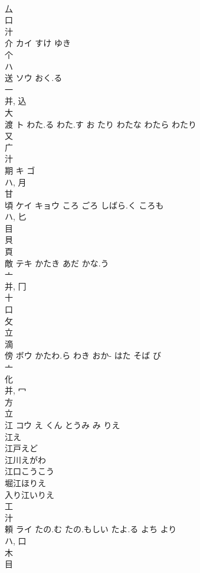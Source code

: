 \documentclass[8pt]{extreport}
\begin{document}
\begin{CJK}{UTF8}{min}
\\	厶 
\\	口 
\\	汁 
\\	介	カイ	すけ ゆき	
\\	个 
\\	ハ	
\\	送	ソウ	おく.る	
\\	一 
\\	并, 込 
\\	大 
\\	渡	ト	わた.る わた.す お たり わたな わたら わたり	
\\	又 
\\	广 
\\	汁 
\\	期	キ ゴ		
\\	ハ, 月 
\\	甘 
\\	頃	ケイ キョウ	ころ ごろ しばら.く ころも	
\\	ハ, 匕 
\\	目 
\\	貝 
\\	頁 
\\	敵	テキ	かたき あだ かな.う	
\\	亠 
\\	并, 冂 
\\	十 
\\	口 
\\	攵 
\\	立 
\\	滴 
\\	傍	ボウ	かたわ.ら わき おか- はた そば び	
\\	亠 
\\	化 
\\	并, 冖 
\\	方 
\\	立 
\\	江	コウ	え くん とうみ み りえ	
\\	江え
\\	江戸えど
\\	江川えがわ
\\	江口こうこう
\\	堀江ほりえ
\\	入り江いりえ
\\	工 
\\	汁 
\\	頼	ライ	たの.む たの.もしい たよ.る よち より	
\\	ハ, 口 
\\	木 
\\	目 

\end{CJK}
\end{document}
